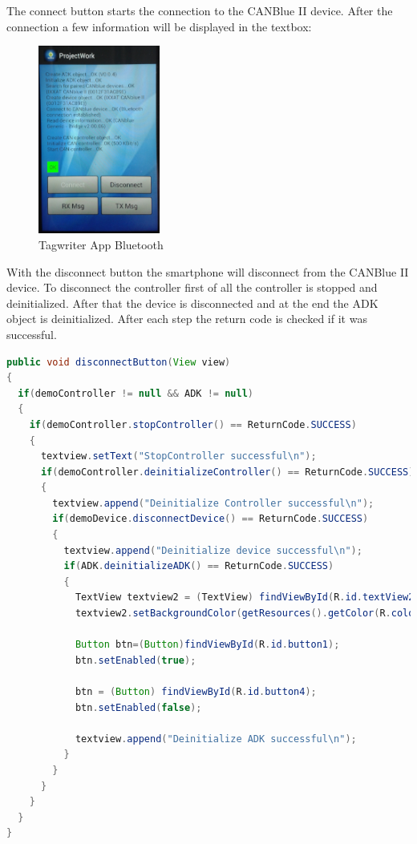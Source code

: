 \documentclass[11pt]{article}
\begin{document}
The connect button starts the connection to the CANBlue II device. After the connection a few information will be displayed in the textbox:
\begin{figure}[H]

 \centering
 \includegraphics [width=4cm]{connectbutton.png} 
 \caption{Tagwriter App Bluetooth}
\end{figure}

With the disconnect button the smartphone will disconnect from the CANBlue II device. To disconnect the controller first of all the controller is stopped and  deinitialized. After that the device is disconnected and at the end the ADK object is deinitialized. After each step the return code is checked if it was successful.


\begin{lstlisting}[language=java]
public void disconnectButton(View view)
{				
  if(demoController != null && ADK != null)
  {
    if(demoController.stopController() == ReturnCode.SUCCESS)
    {
      textview.setText("StopController successful\n");
      if(demoController.deinitializeController() == ReturnCode.SUCCESS)
      {
        textview.append("Deinitialize Controller successful\n");
        if(demoDevice.disconnectDevice() == ReturnCode.SUCCESS)
        {
          textview.append("Deinitialize device successful\n");
          if(ADK.deinitializeADK() == ReturnCode.SUCCESS)
          {
            TextView textview2 = (TextView) findViewById(R.id.textView2);
            textview2.setBackgroundColor(getResources().getColor(R.color.red));
            
            Button btn=(Button)findViewById(R.id.button1);
            btn.setEnabled(true);
            
            btn = (Button) findViewById(R.id.button4);
            btn.setEnabled(false);
            
            textview.append("Deinitialize ADK successful\n");
          }
        }
      }
    }
  }
}	
\end{lstlisting}
\end{document}
